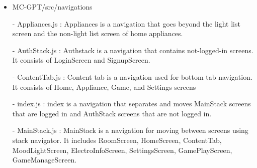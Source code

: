 \documentclass[conference]{IEEEtran}
\begin{document}
\begin{itemize}
                \item MC-GPT/src/navigations
                    \item[-] Appliances.js : Appliances is a navigation that goes beyond the light list screen and the non-light list screen of home appliances.
                    \item[-] AuthStack.js : Authstack is a navigation that contains not-logged-in screens. It consists of LoginScreen and SignupScreen.
                    \item[-] ContentTab.js : Content tab is a navigation used for bottom tab navigation. It consists of Home, Appliance, Game, and Settings screens
                    \item[-] index.js : index is a navigation that separates and moves MainStack screens that are logged in and AuthStack screens that are not logged in.
                    \item[-] MainStack.js : MainStack is a navigation for moving between screens using stack navigator. It includes RoomScreen, HomeScreen, ContentTab, MoodLightScreen, ElectroInfoScreen, SettingsScreen, GamePlayScreen, GameManageScreen.
                \vspace{3mm}
                

\end{itemize}
\end{document}
